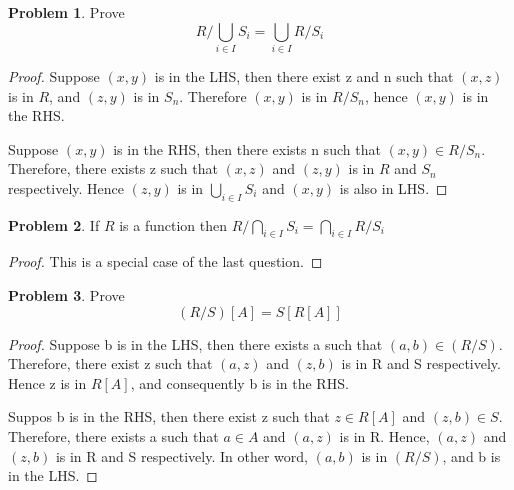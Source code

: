 \documentclass[a4paper,11pt]{article}%
\theoremstyle{remark}
\theoremstyle{definition}
\newtheorem{problem}{Problem}[subsection]
\begin{document}
\begin{problem}
    Prove
    \[R/\bigcup_{i\in I}S_i=\bigcup_{i\in I}R/S_i\]
    \begin{proof}
        Suppose $(x,y)$ is in the LHS, then there exist z and n such that
        $(x,z)$ is in $R$, and $(z,y)$ is in $S_n$. Therefore $(x,y)$ is in 
        $R/S_n$, hence $(x,y)$ is in the RHS.

        Suppose $(x,y)$ is in the RHS, then there exists n such that $(x,y)\in R/S_n$.
        Therefore, there exists z such that $(x,z)$ and $(z,y)$ is in $R$ and 
        $S_n$ respectively. Hence $(z,y)$ is in $\bigcup_{i\in I}S_i$ and $(x,y)$
        is also in LHS.
    \end{proof}
\end{problem}
\begin{problem}
    If $R$ is a function then $R/\bigcap_{i\in I}S_i=\bigcap_{i\in I}R/S_i$
    \begin{proof}
       This is a special case of the last question. 
    \end{proof}
\end{problem}
\begin{problem}
    Prove
    \[(R/S)[A]=S[R[A]]\]
    \begin{proof}
        Suppose b is in the LHS, then there exists a such that $(a,b)\in (R/S)$.
        Therefore, there exist z such that $(a,z)$ and $(z,b)$ is in R and S respectively.
        Hence z is in $R[A]$, and consequently b is in the RHS.

        Suppos b is in the RHS, then there exist z such that $z\in R[A]$ and 
        $(z,b)\in S$. Therefore, there exists a such that $a\in A$ and $(a,z)$ is in
        R. Hence, $(a,z)$ and $(z,b)$ is in R and S respectively. In other word, $(a,b)$
        is in $(R/S)$, and b is in the LHS.
    \end{proof}
\end{problem}
\end{document}
